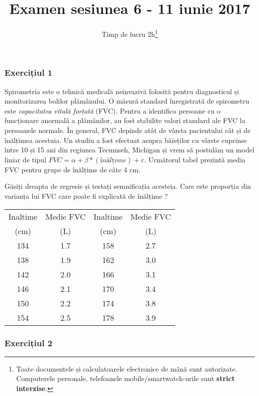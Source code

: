 \documentclass[]{article}
\title{Examen sesiunea 6 - 11 iunie 2017}
\subtitle{Timp de lucru 2h\footnote{Toate documentele și calculatoarele
  electronice de mână sunt autorizate. Computerele personale,
  telefoanele mobile/smartwatch-urile sunt \textbf{strict interzise}.}}
\author{}
\date{}
\begin{document}
\maketitle

\thispagestyle{fancy}

\subsubsection{Exercițiul 1}\label{exercitiul-1}

Spirometria este o tehnică medicală neinvazivă folosită pentru
diagnosticul și monitorizarea bolilor plămânului. O măsură standard
înregistrată de spirometru este \emph{capacitatea vitală forțată} (FVC).
Pentru a identifica persoane cu o funcționare anormală a plămânilor, au
fost stabilite valori standard ale FVC la persoanele normale. În
general, FVC depinde atât de vârsta pacientului cât și de înălțimea
acestuia. Un studiu a fost efectuat asupra băieților cu vârste cuprinse
între 10 și 15 ani din regiunea Tecumseh, Michigan și vrem să postulăm
un model liniar de tipul
\(FVC = \alpha + \beta*(înălțime) + \varepsilon\). Următorul tabel
prezintă media FVC pentru grupe de înălțime de câte 4 cm.

Găsiți dreapta de regresie și testați semnificația acesteia. Care este
proporția din varianța lui FVC care poate fi explicată de înălțime ?

\begin{center}
\begin{table}[ht]
\centering
  \begin{tabular}{cccc}
  \toprule
    Inaltime & Medie FVC & Inaltime & Medie FVC\\
    (cm) & (L) & (cm) & (L)\\
  \midrule
    134 & 1.7 & 158 & 2.7\\
    138 & 1.9 & 162 & 3.0\\
    142 & 2.0 & 166 & 3.1\\
    146 & 2.1 & 170 & 3.4\\
    150 & 2.2 & 174 & 3.8\\
    154 & 2.5 & 178 & 3.9\\
  \bottomrule
    
  \end{tabular}
\end{table}
\end{center}

\subsubsection{Exercițiul 2}\label{exercitiul-2}
\end{document}
